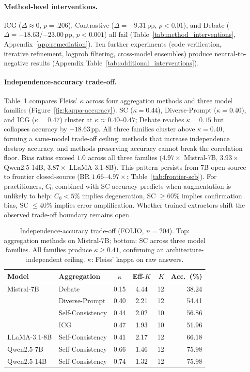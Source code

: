 \paragraph{Method-level interventions.} ICG ($\Delta \approx 0$, $p = .206$), Contrastive ($\Delta = -9.31$\,pp, $p < 0.01$), and Debate ($\Delta = -18.63$/$-23.00$\,pp, $p < 0.001$) all fail (Table~\ref{tab:method_interventions}, Appendix~\ref{app:remediation}). Ten further experiments (code verification, iterative refinement, logprob filtering, cross-model ensembles) produce neutral-to-negative results (Appendix Table~\ref{tab:additional_interventions}).

\paragraph{Independence-accuracy trade-off.} Table~\ref{tab:kappa_generalization} compares Fleiss' $\kappa$ across four aggregation methods and three model families (Figure~\ref{fig:kappa-accuracy}). SC ($\kappa = 0.44$), Diverse-Prompt ($\kappa = 0.40$), and ICG ($\kappa = 0.47$) cluster at $\kappa \approx 0.40$--$0.47$; Debate reaches $\kappa = 0.15$ but collapses accuracy by $-18.63$\,pp. All three families cluster above $\kappa = 0.40$, forming a same-model trade-off ceiling: methods that increase independence destroy accuracy, and methods preserving accuracy cannot break the correlation floor. Bias ratios exceed $1.0$ across all three families ($4.97\times$ Mistral-7B, $3.93\times$ Qwen2.5-14B, $3.87\times$ LLaMA-3.1-8B). This pattern persists from 7B open-source to frontier closed-source (BR $1.66$--$4.97\times$; Table~\ref{tab:frontier-scb}). For practitioners, $C_0$ combined with SC accuracy predicts when augmentation is unlikely to help: $C_0 < 5\%$ implies degeneration, SC $\geq 60\%$ implies confirmation bias, SC $\leq 40\%$ implies error amplification. Whether trained extractors shift the observed trade-off boundary remains open.

\begin{table}[t]
\centering
\small
\caption{Independence-accuracy trade-off (FOLIO, $n = 204$). Top: aggregation methods on Mistral-7B; bottom: SC across three model families. All families produce $\kappa \geq 0.41$, confirming an architecture-independent ceiling. $\kappa$: Fleiss' kappa on raw answers.}
\label{tab:kappa_generalization}
\setlength{\tabcolsep}{3.5pt}
\begin{tabular}{@{}llccrr@{}}
\toprule
Model & Aggregation & $\kappa$ & Eff-$K$ & $K$ & Acc.\ (\%) \\
\midrule
Mistral-7B & Debate & 0.15 & 4.44 & 12 & 38.24 \\
& Diverse-Prompt & 0.40 & 2.21 & 12 & 54.41 \\
& Self-Consistency & 0.44 & 2.02 & 10 & 56.86 \\
& ICG & 0.47 & 1.93 & 10 & 51.96 \\
\addlinespace
LLaMA-3.1-8B & Self-Consistency & 0.41 & 2.17 & 12 & 66.18 \\
Qwen2.5-7B & Self-Consistency & 0.66 & 1.46 & 12 & 75.98 \\
Qwen2.5-14B & Self-Consistency & 0.74 & 1.32 & 12 & 75.98 \\
\bottomrule
\end{tabular}
\end{table}

